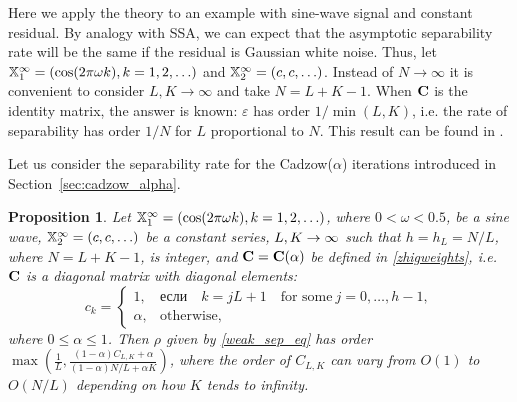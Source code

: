 \documentclass[sii]{ipart}
\newtheorem{proposition}{Proposition}
\begin{document}
Here we apply the theory to an example with sine-wave signal and constant residual. By analogy with SSA, we can expect that the asymptotic separability rate will be the same if the residual is Gaussian white noise.
Thus, let
$\mathbb{X}_1^\infty = (\cos(2 \pi \omega k), k = 1, 2, \ldots)$ and  $\mathbb{X}_2^\infty = (c, c, \ldots)$. Instead of $N \to \infty$ it is convenient to consider $L,K \to \infty$ and take $N = L + K - 1$. When $\mathbf{C}$ is the identity matrix, the answer is known: $\varepsilon$ has order $1/\min(L,K)$, i.e. the rate of separability has order $1/N$ for $L$ proportional to $N$.
This result can be found in \cite[Chapter 6.1]{Golyandina.etal2001}. 

\smallskip
Let us consider the separability rate for the Cadzow($\alpha$) iterations introduced in Section~\ref{sec:cadzow_alpha}.

\begin{proposition}
	\label{prop:separ1} 
	Let $\mathbb{X}_1^\infty = (\cos(2 \pi \omega k), k = 1, 2, \ldots)$, where $0<\omega <0.5$, be a sine wave, $\mathbb{X}_2^\infty = (c, c, \ldots)$ be a constant series,  $L,K\rightarrow \infty$ such that $h = h_L = N/L$, where $N=L+K-1$, is integer, and $\mathbf{C}=\mathbf{C}(\alpha)$ be defined in \eqref{zhigweights}, i.e.  $\mathbf{C}$ is a diagonal matrix with diagonal elements:
	\begin{equation*}
	c_k = \begin{cases}
	1, & \text{если} \quad k = jL+1 \quad \text{for some} \ j = 0, \ldots, h-1,\\
	\alpha, & \text{otherwise},
	\end{cases}
	\end{equation*}
	where $0 \le \alpha \le 1$. Then $\rho$ given by \eqref{weak_sep_eq} has order $\max\left(\frac{1}{L}, \frac{(1-\alpha)C_{L,K}+\alpha}{(1-\alpha)N/L+\alpha K}\right)$, where the order of $C_{L,K}$
	can vary from $O(1)$ to $O(N/L)$ depending on how $K$ tends to infinity.
\end{proposition}
\end{document}
